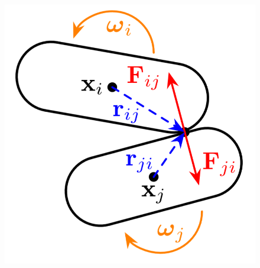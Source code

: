 \documentclass[10pt,t]{beamer}
\begin{document}
\begin{frame}
\begin{columns}[c]
        \begin{column}{0.35\textwidth}
            \vspace{-0.5cm}
            \begin{figure}
                \centering
                \includegraphics[width=1\textwidth]{figures/spherocylinder_model_collision.png}
            \end{figure}
        \end{column}
    \end{columns}

\end{frame}
\end{document}
